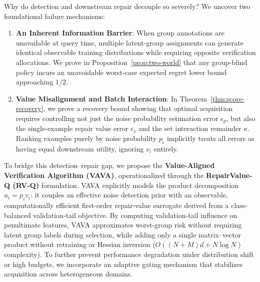\documentclass{article}
\begin{document}
Why do detection and downstream repair decouple so severely? We uncover two foundational failure mechanisms:
\begin{enumerate}[leftmargin=1.3em,topsep=1pt,itemsep=0.5pt,parsep=0pt]
  \item \textbf{An Inherent Information Barrier}: When group annotations are unavailable at query time, multiple latent-group assignments can generate identical observable training distributions while requiring opposite verification allocations. We prove in Proposition~\ref{prop:two-world} that any group-blind policy incurs an unavoidable worst-case expected regret lower bound approaching $1/2$.
  \item \textbf{Value Misalignment and Batch Interaction}: In Theorem~\ref{thm:score-recovery}, we prove a recovery bound showing that optimal acquisition requires controlling not just the noise probability estimation error $\epsilon_p$, but also the single-example repair value error $\epsilon_v$ and the set interaction remainder $\kappa$. Ranking examples purely by noise probability $p_i$ implicitly treats all errors as having equal downstream utility, ignoring $v_i$ entirely.
\end{enumerate}

To bridge this detection--repair gap, we propose the \textbf{Value-Aligned Verification Algorithm (VAVA)}, operationalized through the \textbf{RepairValue-Q (RV-Q)} formulation. VAVA explicitly models the product decomposition $u_i = p_i v_i$: it couples an effective noise detection prior with an observable, computationally efficient first-order repair-value surrogate derived from a class-balanced validation-tail objective. By computing validation-tail influence on penultimate features, VAVA approximates worst-group risk without requiring latent group labels during selection, while adding only a single matrix--vector product without retraining or Hessian inversion ($O((N+M)d + N\log N)$ complexity). To further prevent performance degradation under distribution shift or high budgets, we incorporate an adaptive gating mechanism that stabilizes acquisition across heterogeneous domains.
\end{document}
